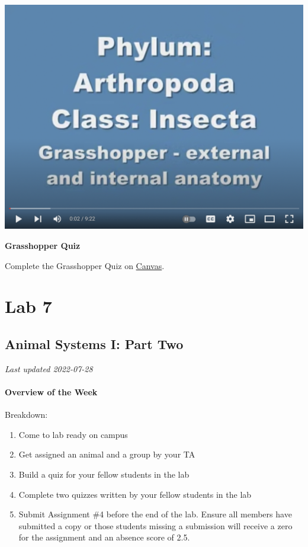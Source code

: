 \documentclass[
]{book}
\providecommand{\tightlist}{%
  \setlength{\itemsep}{0pt}\setlength{\parskip}{0pt}}
\begin{document}
\includegraphics{images/Lab6_Grasshopper_Dissection_Video1.png}

\textbf{Grasshopper Quiz}

Complete the Grasshopper Quiz on \href{https://canvas.ubc.ca/}{Canvas}.

\hypertarget{part-lab-7}{%
\part*{Lab 7}\label{part-lab-7}}

\hypertarget{animal-systems-i-part-two}{%
\chapter*{Animal Systems I: Part Two}\label{animal-systems-i-part-two}}

\emph{Last updated 2022-07-28}

\hypertarget{overview-of-the-week-1}{%
\subsection*{Overview of the Week}\label{overview-of-the-week-1}}

Breakdown:

\begin{enumerate}
\def\labelenumi{\arabic{enumi}.}
\tightlist
\item
  Come to lab ready on campus
\item
  Get assigned an animal and a group by your TA
\item
  Build a quiz for your fellow students in the lab
\item
  Complete two quizzes written by your fellow students in the lab
\item
  Submit Assignment \#4 before the end of the lab. Ensure all members have submitted a copy or those students missing a submission will receive a zero for the assignment and an absence score of 2.5.
\end{enumerate}
\end{document}
